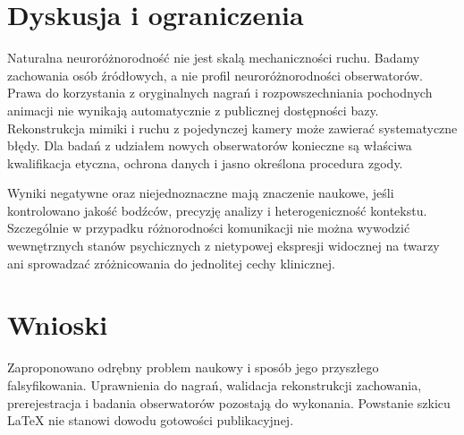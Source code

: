 \documentclass[11pt,a4paper]{article}
\begin{document}
\section{Dyskusja i ograniczenia}
Naturalna neuroróżnorodność nie jest skalą mechaniczności ruchu. Badamy zachowania osób źródłowych, a nie profil neuroróżnorodności obserwatorów. Prawa do korzystania z oryginalnych nagrań i rozpowszechniania pochodnych animacji nie wynikają automatycznie z publicznej dostępności bazy. Rekonstrukcja mimiki i ruchu z pojedynczej kamery może zawierać systematyczne błędy. Dla badań z udziałem nowych obserwatorów konieczne są właściwa kwalifikacja etyczna, ochrona danych i jasno określona procedura zgody.

Wyniki negatywne oraz niejednoznaczne mają znaczenie naukowe, jeśli kontrolowano jakość bodźców, precyzję analizy i heterogeniczność kontekstu. Szczególnie w przypadku różnorodności komunikacji nie można wywodzić wewnętrznych stanów psychicznych z nietypowej ekspresji widocznej na twarzy ani sprowadzać zróżnicowania do jednolitej cechy klinicznej.
\section{Wnioski}
Zaproponowano odrębny problem naukowy i sposób jego przyszłego falsyfikowania. Uprawnienia do nagrań, walidacja rekonstrukcji zachowania, prerejestracja i badania obserwatorów pozostają do wykonania. Powstanie szkicu LaTeX nie stanowi dowodu gotowości publikacyjnej.
\end{document}
